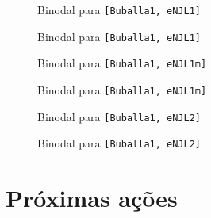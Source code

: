 \begin{figure}
	
	\caption{Binodal para \texttt{[Buballa1, eNJL1]}}
	\label{Fig:Binodal1}
\end{figure}

\begin{figure}
	
	\caption{Binodal para \texttt{[Buballa1, eNJL1]}}
	\label{Fig:Binodal2}
\end{figure}

\begin{figure}
	
	\caption{Binodal para \texttt{[Buballa1, eNJL1m]}}
	\label{Fig:Binodal3}
\end{figure}

\begin{figure}
	
	\caption{Binodal para \texttt{[Buballa1, eNJL1m]}}
	\label{Fig:Binodal4}
\end{figure}

\begin{figure}
	
	\caption{Binodal para \texttt{[Buballa1, eNJL2]}}
	\label{Fig:Binodal5}
\end{figure}

\begin{figure}
	
	\caption{Binodal para \texttt{[Buballa1, eNJL2]}}
	\label{Fig:Binodal6}
\end{figure}


\section{Próximas ações}

